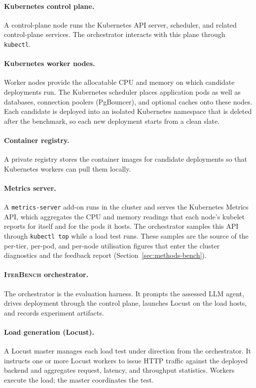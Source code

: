 \paragraph{Kubernetes control plane.}
A control-plane node runs the Kubernetes API server, scheduler, and related
control-plane services. The orchestrator interacts with this plane through
\texttt{kubectl}.

\paragraph{Kubernetes worker nodes.}
Worker nodes provide the allocatable CPU and memory on which candidate
deployments run. The Kubernetes scheduler places application pods as well as
databases, connection poolers (PgBouncer), and optional caches onto these
nodes. Each candidate is deployed into an isolated Kubernetes namespace that
is deleted after the benchmark, so each new deployment starts from a clean
slate.

\paragraph{Container registry.}
A private registry stores the container images for candidate deployments so
that Kubernetes workers can pull them locally.

\paragraph{Metrics server.}
A \texttt{metrics-server} add-on runs in the cluster and serves the Kubernetes
Metrics API, which aggregates the CPU and memory readings that each node's
kubelet reports for itself and for the pods it hosts. The orchestrator samples
this API through \texttt{kubectl top} while a load test runs. These samples are
the source of the per-tier, per-pod, and per-node utilisation figures that enter
the cluster diagnostics and the feedback report
(Section~\ref{sec:methods-bench}).

\paragraph{\textsc{IterBench} orchestrator.}
The orchestrator is the evaluation harness. It prompts the assessed LLM agent,
drives deployment through the control plane, launches Locust on the load
hosts, and records experiment artifacts.

\paragraph{Load generation (Locust).}
A Locust master manages each load test under direction from the orchestrator. It
instructs one or more Locust workers to issue HTTP traffic against the
deployed backend and aggregates request, latency, and throughput statistics.
Workers execute the load; the master coordinates the test.


